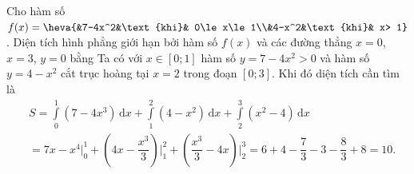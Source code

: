 \begin{ex}%
Cho hàm số $f(x)=\heva{&7-4x^2&\text{khi}& 0\le x\le 1\\&4-x^2&\text{khi}&  x> 1}$. Diện tích hình phẳng giới hạn bởi hàm số $f(x)$ và các đường thẳng $x=0$, $x=3$, $y=0$ bằng
\loigiai
{Ta có với $x\in [0;1]$ hàm số $y=7-4x^2>0$ và hàm số $y=4-x^2$ cắt trục hoàng tại $x=2$ trong đoạn $[0;3]$. Khi đó diện tích cần tìm là
\[
\begin{aligned}
& S=\displaystyle\int\limits_0^1 \left( 7-4 x^3\right)  \mathrm{\,d}x+\displaystyle\int\limits_1^2\left(  4-x^2\right)  \mathrm{\,d}x+\displaystyle\int\limits_2^3 \left( x^2-4\right)  \mathrm{\,d}x \\
& =7 x-x^4\Bigg|_0 ^1+\left(4 x-\dfrac{x^3}{3}\right)\Bigg|_1 ^2+\left(\dfrac{x^3}{3}-4 x\right)\Bigg|_2 ^3=6+4-\dfrac{7}{3}-3-\dfrac{8}{3}+8=10.
\end{aligned}
\]
}
\end{ex}


